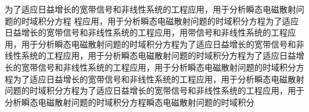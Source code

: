 

\begin{chineseabstract}
    为了适应日益增长的宽带信号和非线性系统的工程应用，用于分析瞬态电磁散射问题的时域积分方程
    程应用，用于分析瞬态电磁散射问题的时域积分方程为了适应日益增长的宽带信号和非线性系统的工程应用，用带信号和非线性系统的工程应用，用于分析瞬态电磁散射问题的时域积分方程为了适应日益增长的宽带信号和非线性系统的工程应用，用于分析瞬态电磁散射问题的时域积分方程为了适应日益增长的宽带信号和非线性系统的工程应用，用于分析瞬态电磁散射问题的时域积分方程为了适应日益增长的宽带信号和非线性系统的工程应用，用于分析瞬态电磁散射问题的时域积分方程为了适应日益增长的宽带信号和非线性系统的工程应用，用于分析瞬态电磁散射问题的时域积分方程瞬态电磁散射问题的时域积分

\end{chineseabstract}

